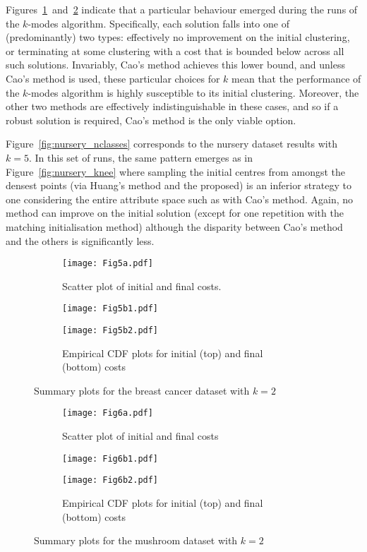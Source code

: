 Figures~\ref{fig:breast_cancer_nclasses}~and~\ref{fig:mushroom_nclasses}
indicate that a particular behaviour emerged during the runs of the \(k\)-modes
algorithm. Specifically, each solution falls into one of (predominantly) two
types: effectively no improvement on the initial clustering, or terminating at
some clustering with a cost that is bounded below across all such solutions.
Invariably, Cao's method achieves this lower bound, and unless Cao's method is
used, these particular choices for \(k\) mean that the performance of the
\(k\)-modes algorithm is highly susceptible to its initial clustering. Moreover,
the other two methods are effectively indistinguishable in these cases, and so
if a robust solution is required, Cao's method is the only viable option.

Figure~\ref{fig:nursery_nclasses} corresponds to the nursery dataset results
with \(k=5\). In this set of runs, the same pattern emerges as in
Figure~\ref{fig:nursery_knee} where sampling the initial centres from amongst
the densest points (via Huang's method and the proposed) is an inferior strategy
to one considering the entire attribute space such as with Cao's method. Again,
no method can improve on the initial solution (except for one repetition with
the matching initialisation method) although the disparity between Cao's method
and the others is significantly less.

\begin{figure}
    \begin{subfigure}{.5\textwidth}
        \texttt{[image: Fig5a.pdf]}
        \caption{Scatter plot of initial and final costs.}
    \end{subfigure}
    \hfill%
    \begin{subfigure}{.5\textwidth}
        \texttt{[image: Fig5b1.pdf]}

        \texttt{[image: Fig5b2.pdf]}
        \caption{Empirical CDF plots for initial (top) and final (bottom) costs}
    \end{subfigure}
    \caption{Summary plots for the breast cancer dataset with \(k=2\)}%
    \label{fig:breast_cancer_nclasses}
\end{figure}

\begin{figure}
    \begin{subfigure}{.5\textwidth}
        \texttt{[image: Fig6a.pdf]}
        \caption{Scatter plot of initial and final costs}
    \end{subfigure}
    \hfill%
    \begin{subfigure}{.5\textwidth}
        \texttt{[image: Fig6b1.pdf]}

        \texttt{[image: Fig6b2.pdf]}
        \caption{Empirical CDF plots for initial (top) and final (bottom) costs}
    \end{subfigure}
    \caption{Summary plots for the mushroom dataset with \(k=2\)}%
    \label{fig:mushroom_nclasses}
\end{figure}

